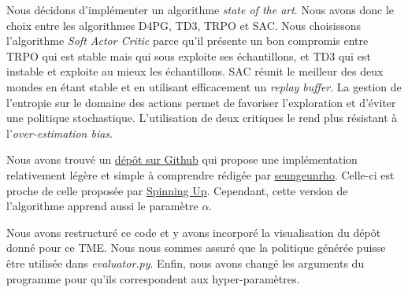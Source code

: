 Nous décidons d'implémenter un algorithme \emph{state of the art}. Nous avons donc le choix entre les algorithmes D4PG, TD3, TRPO et SAC. Nous choisissons l'algorithme \emph{Soft Actor Critic} parce qu'il présente un bon compromis entre TRPO qui est stable mais qui sous exploite ses échantillons, et TD3 qui est instable et exploite au mieux les échantillons. SAC réunit le meilleur des deux mondes en étant stable et en utilisant efficacement un \emph{replay buffer}. La gestion de l'entropie sur le domaine des actions permet de favoriser l'exploration et d'éviter une politique stochastique. L'utilisation de deux critiques le rend plus résistant à l'\emph{over-estimation bias}.

Nous avons trouvé un \href{https://github.com/seungeunrho/minimalRL/blob/master/sac.py}{dépôt sur Github} qui propose une implémentation relativement légère et simple à comprendre rédigée par \href{https://github.com/seungeunrho}{seungeunrho}. Celle-ci est proche de celle proposée par \href{https://spinningup.openai.com/en/latest/algorithms/sac.html}{Spinning Up}. Cependant, cette version de l'algorithme apprend aussi le paramètre $\alpha$.

Nous avons restructuré ce code et y avons incorporé la visualisation du dépôt donné pour ce TME. Nous nous sommes assuré que la politique générée puisse être utilisée dans \emph{evaluator.py}. Enfin, nous avons changé les arguments du programme pour qu'ils correspondent aux hyper-paramètres.